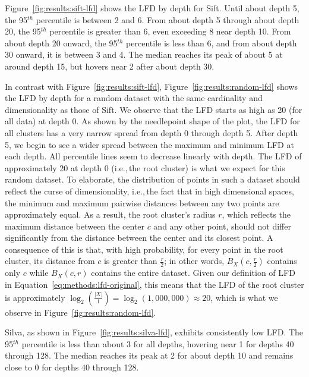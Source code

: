 Figure~\ref{fig:results:sift-lfd} shows the LFD by depth for Sift.
Until about depth 5, the 95$^{th}$ percentile is between 2 and 6.
From about depth 5 through about depth 20, the 95$^{th}$ percentile is greater than 6, even exceeding 8 near depth 10.
From about depth 20 onward, the 95$^{th}$ percentile is less than 6, and from about depth 30 onward, it is between 3 and 4.
The median reaches its peak of about 5 at around depth 15, but hovers near 2 after about depth 30.

In contrast with Figure~\ref{fig:results:sift-lfd}, Figure~\ref{fig:results:random-lfd} shows the LFD by depth for a random dataset with the same cardinality and dimensionality as those of Sift.
We observe that the LFD starts as high as 20 (for all data) at depth 0.
As shown by the needlepoint shape of the plot, the LFD for all clusters has a very narrow spread from depth 0 through depth 5.
After depth 5, we begin to see a wider spread between the maximum and minimum LFD at each depth.
All percentile lines seem to decrease linearly with depth.
The LFD of approximately 20 at depth 0 (i.e.,\,the root cluster) is what we expect for this random dataset.
To elaborate, the distribution of points in such a dataset should reflect the curse of dimensionality, i.e.,\,the fact that in high dimensional spaces, the minimum and maximum pairwise distances between any two points are approximately equal.
As a result, the root cluster's radius $r$, which reflects the maximum distance between the center $c$ and any other point, should not differ significantly from the distance between the center and its closest point.
A consequence of this is that, with high probability, for every point in the root cluster, its distance from $c$ is greater than $\tfrac{r}{2}$;
in other words, $B_X(c, \tfrac{r}{2})$ contains only $c$ while $B_X(c, r)$ contains the entire dataset.
Given our definition of LFD in Equation~\ref{eq:methods:lfd-original}, this means that the LFD of the root cluster is approximately $\log_2(\frac{|X|}{1}) = \log_2(1,000,000) \approx 20$, which is what we observe in Figure~\ref{fig:results:random-lfd}.

Silva, as shown in Figure~\ref{fig:results:silva-lfd}, exhibits consistently low LFD.
The 95$^{th}$ percentile is less than about 3 for all depths, hovering near 1 for depths 40 through 128.
The median reaches its peak at 2 for about depth 10 and remains close to 0 for depths 40 through 128.

